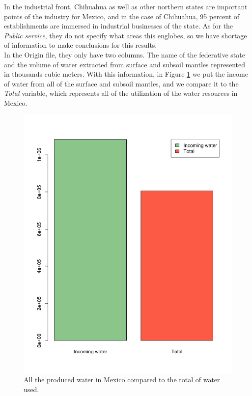 \documentclass{article}
\begin{document}
In the industrial front, Chihuahua as well as other northern states are important points of the industry for Mexico, and in the case of Chihuahua, 95 percent of establishments are immersed in industrial businesses of the state\cite{industria}. As for the \textit{Public service}, they do not specify what areas this englobes, so we have shortage of information to make conclusions for this results.\\

In the Origin file, they only have two columns. The name of the federative state and the volume of water extracted from surface and subsoil mantles represented in thousands cubic meters. With this information, in Figure \ref{fig4} we put the income of water from all of the surface and subsoil mantles, and we compare it to the \textit{Total} variable, which represents all of the utilization of the water resources in Mexico.\\

\begin{figure}[htp]
	\centering
	\includegraphics[width=\linewidth]{histo2.png}
	\caption{All the produced water in Mexico compared to the total of water used. }\label{fig4}
\end{figure}
\clearpage
\end{document}
